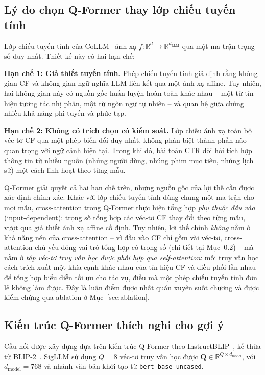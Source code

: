 \subsection{Lý do chọn Q-Former thay lớp chiếu tuyến tính}
\label{ssec:ly-do-qformer}

Lớp chiếu tuyến tính của CoLLM~\cite{collm2023} ánh xạ $f: \mathbb{R}^d
\rightarrow \mathbb{R}^{d_{\text{LLM}}}$ qua một ma trận trọng số duy nhất. Thiết kế
này có hai hạn chế:

\textbf{Hạn chế 1: Giả thiết tuyến tính.} Phép chiếu tuyến tính giả định rằng không gian
CF và không gian ngữ nghĩa LLM liên kết qua một ánh xạ affine. Tuy nhiên, hai không gian
này có nguồn gốc huấn luyện hoàn toàn khác nhau -- một từ tín hiệu tương tác nhị phân,
một từ ngôn ngữ tự nhiên -- và quan hệ giữa chúng nhiều khả năng phi tuyến và phức tạp.

\textbf{Hạn chế 2: Không có trích chọn có kiểm soát.} Lớp chiếu ánh xạ toàn bộ véc-tơ
CF qua một phép biến đổi duy nhất, không phân biệt thành phần nào quan trọng với ngữ
cảnh hiện tại. Trong khi đó, bài toán CTR đòi hỏi tích hợp thông tin từ nhiều nguồn
(nhúng người dùng, nhúng phim mục tiêu, nhúng lịch sử) một cách linh hoạt theo từng mẫu.

Q-Former giải quyết cả hai hạn chế trên, nhưng nguồn gốc của lợi thế cần được xác định
chính xác. Khác với lớp chiếu tuyến tính dùng chung một ma trận cho mọi mẫu,
cross-attention trong Q-Former thực hiện tổng hợp \textit{phụ thuộc đầu vào}
(input-dependent): trọng số tổng hợp các véc-tơ CF thay đổi theo từng mẫu, vượt qua giả
thiết ánh xạ affine cố định. Tuy nhiên, lợi thế chính \textit{không} nằm ở khả năng nén
của cross-attention -- vì đầu vào CF chỉ gồm vài véc-tơ, cross-attention chủ yếu đóng vai
trò tổng hợp có trọng số (chi tiết tại Mục~\ref{ssec:qformer-kien-truc}) -- mà nằm ở
\textit{tập véc-tơ truy vấn học được phối hợp qua self-attention}: mỗi truy vấn học cách
trích xuất một khía cạnh khác nhau của tín hiệu CF và điều phối lẫn nhau để tổng hợp biểu
diễn tối ưu cho tác vụ, điều mà một phép chiếu tuyến tính đơn lẻ không làm được. Đây là
luận điểm được nhất quán xuyên suốt chương và được kiểm chứng qua ablation ở
Mục~\ref{sec:ablation}.

\subsection{Kiến trúc Q-Former thích nghi cho gợi ý}
\label{ssec:qformer-kien-truc}

Cầu nối được xây dựng dựa trên kiến trúc Q-Former theo InstructBLIP~\cite{instructblip2023},
kế thừa từ BLIP-2~\cite{blip2_2023}. SigLLM sử dụng $Q = 8$ véc-tơ truy vấn học được
$\mathbf{Q} \in \mathbb{R}^{Q \times d_{\text{model}}}$, với $d_{\text{model}} = 768$ và
nhánh văn bản khởi tạo từ \texttt{bert-base-uncased}.

